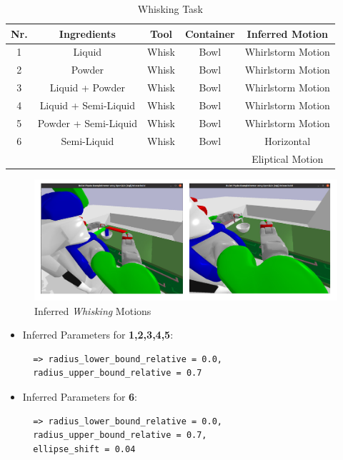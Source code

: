 \begin{table}[H]
  \centering
  \begin{tabular}{|c|c|c|c|c|}
    \hline
    \textbf{Nr.} & \textbf{Ingredients} & \textbf{Tool} & \textbf{Container} & \textbf{Inferred Motion}  \\
    \hline
    1 & Liquid & Whisk & Bowl & Whirlstorm Motion \\
    \hline
    2 & Powder & Whisk & Bowl & Whirlstorm Motion\\
    \hline
    3 & Liquid + Powder & Whisk & Bowl & Whirlstorm Motion \\
    \hline
    4 & Liquid + Semi-Liquid & Whisk & Bowl & Whirlstorm Motion \\
    \hline
    5 & Powder + Semi-Liquid & Whisk & Bowl & Whirlstorm Motion \\
    \hline
    6 & Semi-Liquid & Whisk & Bowl & Horizontal
    \\ & & &  &Eliptical Motion \\
    \hline
  \end{tabular}
  \caption{Whisking Task}
  \label{tab:mixingtask}
\end{table}

\begin{figure}[H]
  \centering
  \includegraphics[scale=0.25]{Graphics/whisking_evaluation.jpg}
  \caption{Inferred \textit{Whisking} Motions}
  \label{fig:mixingverb WikiHow}
\end{figure}

\begin{itemize}
\item Inferred Parameters for \textbf{1,2,3,4,5}: 
 \begin{lstlisting}
  => radius_lower_bound_relative = 0.0, 
  radius_upper_bound_relative = 0.7
\end{lstlisting}
\item Inferred Parameters for \textbf{6}:
\begin{lstlisting}
  => radius_lower_bound_relative = 0.0, 
  radius_upper_bound_relative = 0.7,
  ellipse_shift = 0.04
\end{lstlisting}
\end{itemize}

